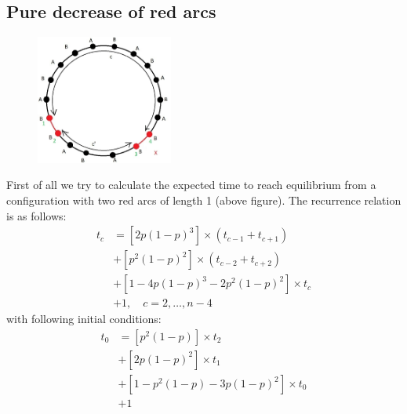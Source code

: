 \documentclass[]{book}
\theoremstyle{definition}
\begin{document}
\subsection{Pure decrease of red arcs}
\begin{figure}[H]
    \centering
    \includegraphics[width=0.4\textwidth]{figures/sync_pure_increase_2.jpg}
    \caption{}
\end{figure}
First of all we try to calculate the expected time to reach equilibrium from a configuration with two red arcs of length 1 (above figure). The recurrence relation is as follows:
\begin{equation}
\begin{split}
    t_c &= \left[2p\left(1-p\right)^3\right] \times \left( t_{c-1}+t_{c+1} \right) \\
    &+ \left[p^2\left(1-p\right)^2\right] \times \left( t_{c-2}+t_{c+2} \right) \\
    &+ \left[1-4p\left(1-p\right)^3-2p^2\left(1-p\right)^2\right] \times t_c \\
    &+ 1,  \quad c = 2,\ldots,n-4
\end{split}
\end{equation}
with following initial conditions:
\begin{equation}
\begin{split}
    t_0 &= \left[ p^2(1-p) \right] \times t_2 \\
    &+ \left[ 2p(1-p)^2 \right] \times t_1 \\
    &+ \left[ 1 -  p^2(1-p) - 3p(1-p)^2 \right] \times t_0 \\
    &+ 1 \\
\end{split}
\end{equation}
\end{document}
